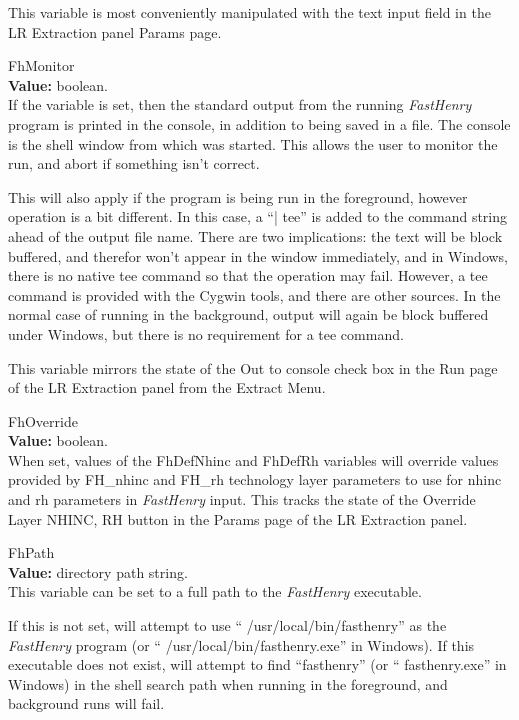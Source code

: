 \begin{description}
This variable is most conveniently manipulated with the text input
field in the {\cb LR Extraction} panel {\cb Params} page.

\item{\et FhMonitor}\\
{\bf Value:} boolean.\\
If the variable is set, then the standard output from the running {\it
FastHenry} program is printed in the console, in addition to being
saved in a file.  The console is the shell window from which {\Xic}
was started.  This allows the user to monitor the run, and abort if
something isn't correct.

This will also apply if the program is being run in the foreground,
however operation is a bit different.  In this case, a ``{\vt | tee}''
is added to the command string ahead of the output file name.  There
are two implications:  the text will be block buffered, and therefor
won't appear in the window immediately, and in Windows, there is no
native {\vt tee} command so that the operation may fail.  However, a
{\vt tee} command is provided with the Cygwin tools, and there are
other sources.  In the normal case of running in the background,
output will again be block buffered under Windows, but there is no
requirement for a {\vt tee} command.

This variable mirrors the state of the {\cb Out to console} check box
in the {\cb Run} page of the {\cb LR Extraction} panel from the
{\cb Extract Menu}.

\item{\et FhOverride}\\
{\bf Value:} boolean.\\
When set, values of the {\et FhDefNhinc} and {\et FhDefRh}
variables will override values provided by {\vt FH\_nhinc} and
{\vt FH\_rh} technology layer parameters to use for {\vt
nhinc} and {\vt rh} parameters in {\it FastHenry} input.  This
tracks the state of the {\cb Override Layer NHINC, RH} button
in the {\cb Params} page of the {\cb LR Extraction} panel. 

\item{\et FhPath}\\
{\bf Value:} directory path string.\\
This variable can be set to a full path to the {\it FastHenry} executable.

If this is not set, {\Xic} will attempt to use ``{\vt
/usr/local/bin/fasthenry}'' as the {\it FastHenry} program (or ``{\vt
/usr/local/bin/fasthenry.exe}'' in Windows).  If this executable does
not exist, {\Xic} will attempt to find ``{\vt fasthenry}'' (or ``{\vt
fasthenry.exe}'' in Windows) in the shell search path when running in
the foreground, and background runs will fail.


\end{description}
